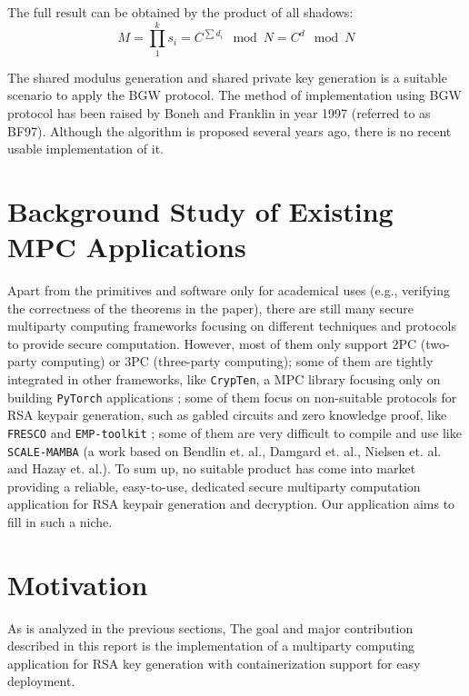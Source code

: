 The full result can be obtained by the product of all shadows:
\begin{equation}
  M = \prod_1^k s_i = C^{\sum d_i}\mod N = C^{d}\mod N
\end{equation}

The shared modulus generation and shared private key generation is a suitable scenario to apply the BGW protocol. The method of implementation using BGW protocol has been raised by Boneh and Franklin in year 1997 (referred to as BF97)\cite{boneh_efficient_1997}. Although the algorithm is proposed several years ago, there is no recent usable implementation of it.

\section{Background Study of Existing MPC Applications}

Apart from the primitives and software only for academical uses (e.g., verifying the correctness of the theorems in the paper), there are still many secure multiparty computing frameworks focusing on different techniques and protocols to provide secure computation. However, most of them only support 2PC (two-party computing) or 3PC (three-party computing); some of them are tightly integrated in other frameworks, like \texttt{CrypTen}, a MPC library focusing only on building \texttt{PyTorch} applications \cite{knott_crypten_2021}; some of them focus on non-suitable protocols for RSA keypair generation, such as gabled circuits and zero knowledge proof, like \texttt{FRESCO} \cite{noauthor_aicisfresco_2022} and \texttt{EMP-toolkit} \cite{emp-toolkit}; some of them are very difficult to compile and use like \texttt{SCALE-MAMBA} (a work based on Bendlin et. al.\cite{bendlin_semi-homomorphic_2010}, Damgard et. al.\cite{damgard_multiparty_2011}, Nielsen et. al.\cite{nielsen_new_2011} and Hazay et. al.\cite{hazay_low_2017}). To sum up, no suitable product has come into market providing a reliable, easy-to-use, dedicated secure multiparty computation application for RSA keypair generation and decryption. Our application aims to fill in such a niche.

\section{Motivation}

As is analyzed in the previous sections, The goal and major contribution described in this report is the implementation of a multiparty computing application for RSA key generation with containerization support for easy deployment.

